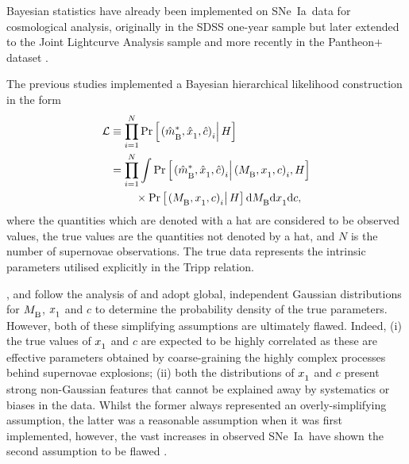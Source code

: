 \documentclass[fleqn,usenatbib]{mnras}
\newcommand{\pplus}{Pantheon$+$}
\newcommand{\sne}{SNe~Ia}
\newcommand{\diff}{\mathrm{d}}
\newcommand{\prior}{\mathrm{Pr}}
\newcommand{\Z}[1]{_{\lower2pt\hbox{$\scriptstyle#1$}}}
\newcommand{\Ns}[1]{_{\lower2pt\hbox{$\scriptstyle\rm#1$}}}
\newcommand{\hblank}[1]{\hbox to#1 mm{\hfil}}
\begin{document}
Bayesian statistics have already been implemented on \sne\ data for cosmological analysis, originally in the SDSS one-year sample \citep{Kessler_2009_Sloan, March_2011} but later extended to the Joint Lightcurve Analysis \citep[JLA,][]{Betoule_2014} sample \citep{Nielsen_2016, Dam_2017} and more recently in the \pplus\ \citep{Scolnic_2022, Brout_2022_cosmo, Brout_2022_cal} dataset \citep{Lane_2023}. 

The previous studies implemented a Bayesian hierarchical likelihood construction in the form
\begin{align}\label{eq:likelihood}
    \mathcal{L} &\equiv \prod_{i = 1}^N \prior\left[\left.(\hat{m}\Ns{B}^{*}, \hat{x}\Z 1, \hat{c}) \Z i \right| H\right] \nonumber\\
    &=  \prod_{i = 1}^N \int \prior\left[\left.(\hat{m}\Ns{B}^{*}, \hat{x}\Z 1, \hat{c}) \Z i \right| (M\Ns{B},x\Z 1,c) \Z i, H\right] \nonumber\\
    &\hblank{8} \times \prior\left[\left.(M\Ns{B}, x\Z 1, c) \Z i \right| H\right]  \diff M\Ns{B} \diff x\Z 1 \diff c,
\end{align}
where the quantities which are denoted with a hat are considered to be observed values, the true values are the quantities not denoted by a hat, and $N$ is the number of supernovae observations. The true data represents the intrinsic parameters utilised explicitly in the Tripp \citep{Tripp_1998} relation.

\citet{Nielsen_2016}, \citet{Dam_2017} and \citet{Lane_2023} follow the analysis of \citet{March_2011} and adopt global, independent Gaussian distributions for $M \Ns{B}$, $x\Z 1$ and $c$ to determine the probability density of the true parameters. However, both of these simplifying assumptions are ultimately flawed. Indeed, (i) the true values of $x\Z 1$ and $c$ are expected to be highly correlated as these are effective parameters obtained by coarse-graining the highly complex processes behind supernovae explosions; (ii) both the distributions of $x\Z1$ and $c$ present strong non-Gaussian features that cannot be explained away by systematics or biases in the data. Whilst the former always represented an overly-simplifying assumption, the latter was a reasonable assumption when it was first implemented, however, the vast increases in observed \sne\ have shown the second assumption to be flawed \citep{Hinton_2019}. 
\end{document}
